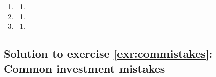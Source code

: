 \documentclass[
  12pt,
  oneside]{book}
\providecommand{\tightlist}{%
  \setlength{\itemsep}{0pt}\setlength{\parskip}{0pt}}
\theoremstyle{definition}
\theoremstyle{definition}
\theoremstyle{definition}
\theoremstyle{definition}
\theoremstyle{remark}
\begin{document}
\begin{enumerate}
\def\labelenumi{\arabic{enumi}.}
\item
  \begin{enumerate}
  \def\labelenumii{\alph{enumii})}
  \tightlist
  \item
  \end{enumerate}
\item
  \begin{enumerate}
  \def\labelenumii{\alph{enumii})}
  \setcounter{enumii}{2}
  \tightlist
  \item
  \end{enumerate}
\item
  \begin{enumerate}
  \def\labelenumii{\alph{enumii})}
  \setcounter{enumii}{1}
  \tightlist
  \item
  \end{enumerate}
\end{enumerate}

\hypertarget{sol:commistakes}{%
\subsection*{Solution to exercise \ref{exr:commistakes}: Common investment mistakes}\label{sol:commistakes}}
\end{document}
